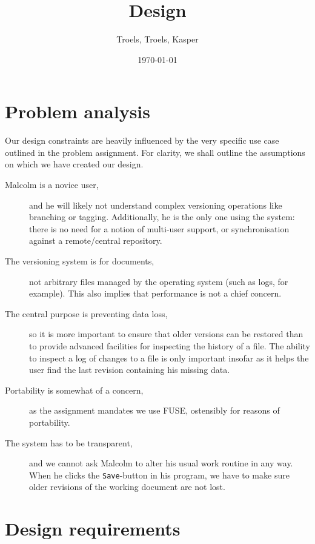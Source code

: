 \documentclass[12pt]{article}
\author{
        Troels, Troels, Kasper
}
\date{\today}
\title{Design}
\begin{document}
 
\maketitle

\section{Problem analysis}

Our design constraints are heavily influenced by the very specific use
case outlined in the problem assignment.  For clarity, we shall
outline the assumptions on which we have created our design.

\begin{description}
\item[Malcolm is a novice user,] and he will likely not understand
  complex versioning operations like branching or tagging.
  Additionally, he is the only one using the system: there is no need
  for a notion of multi-user support, or synchronisation against a
  remote/central repository.
\item[The versioning system is for documents,] not arbitrary files
  managed by the operating system (such as logs, for example).  This
  also implies that performance is not a chief concern.
\item[The central purpose is preventing data loss,] so it is more
  important to ensure that older versions can be restored than to
  provide advanced facilities for inspecting the history of a file.
  The ability to inspect a log of changes to a file is only important
  insofar as it helps the user find the last revision containing his
  missing data.
\item[Portability is somewhat of a concern,] as the assignment
  mandates we use FUSE, ostensibly for reasons of portability.
\item[The system has to be transparent,] and we cannot ask Malcolm to
  alter his usual work routine in any way.  When he clicks the
  \texttt{Save}-button in his program, we have to make sure older
  revisions of the working document are not lost.
\end{description}

\section{Design requirements}
\end{document}
